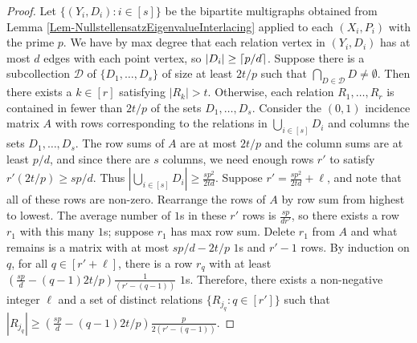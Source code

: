 \documentclass[12pt]{article}
\DeclarePairedDelimiter\ceil{\lceil}{\rceil}
\theoremstyle{definition}
\begin{document}
	\begin{proof}
		Let $\{(Y_i,D_i): i \in [s]\}$ be the bipartite multigraphs obtained from Lemma \ref{Lem-NullstellensatzEigenvalueInterlacing} applied to each $(X_i,P_i)$ with the prime $p$.  We have by max degree that each relation vertex in $(Y_i,D_i)$ has at most $d$ edges with each point vertex, so $|D_i| \geq \ceil{p/d}$.  Suppose there is a subcollection $\mathcal{D}$ of $\{D_1,\ldots, D_s\}$ of size at least $2t/p$ such that $\bigcap_{D \in \mathcal{D}}D \neq \emptyset$.  Then there exists a $k \in [r]$ satisfying $|R_k| > t$.  Otherwise, each relation $R_1, \ldots, R_r$ is contained in fewer than $2t/p$ of the sets $D_1,\ldots, D_s$.  Consider the $(0,1)$ incidence matrix $A$ with rows corresponding to the relations in $\bigcup_{i \in [s]}D_i$ and columns the sets $D_1,\ldots, D_s$.  The row sums of $A$ are at most $2t/p$ and the column sums are at least $p/d$, and since there are $s$ columns, we need enough rows $r'$ to satisfy $r' (2t/p) \geq sp/d$.  Thus $|\bigcup_{i \in [s]}D_i| \geq \tfrac{sp^2}{2td}$.  Suppose $r' = \tfrac{sp^2}{2td} + \ell$, and note that all of these rows are non-zero.  Rearrange the rows of $A$ by row sum from highest to lowest.  The average number of $1$s in these $r'$ rows is $\tfrac{sp}{dr'}$, so there exists a row $r_1$ with this many $1$s; suppose $r_1$ has max row sum.  Delete $r_1$ from $A$ and what remains is a matrix with at most $sp/d - 2t/p$ $1$s and $r'-1$ rows.  By induction on $q$, for all $q \in [r'+\ell]$, there is a row $r_q$ with at least $(\tfrac{sp}{d}-(q-1)2t/p)\tfrac{1}{(r'-(q-1))}$ $1$s.  Therefore, there exists a non-negative integer $\ell$ and a set of distinct relations $\{R_{j_q}: q \in [r']\}$ such that $|R_{j_q}| \geq (\tfrac{sp}{d}-(q-1)2t/p)\tfrac{p}{2(r'-(q-1))}$. \qedhere
		
		
		
		

\end{proof}
\end{document}
